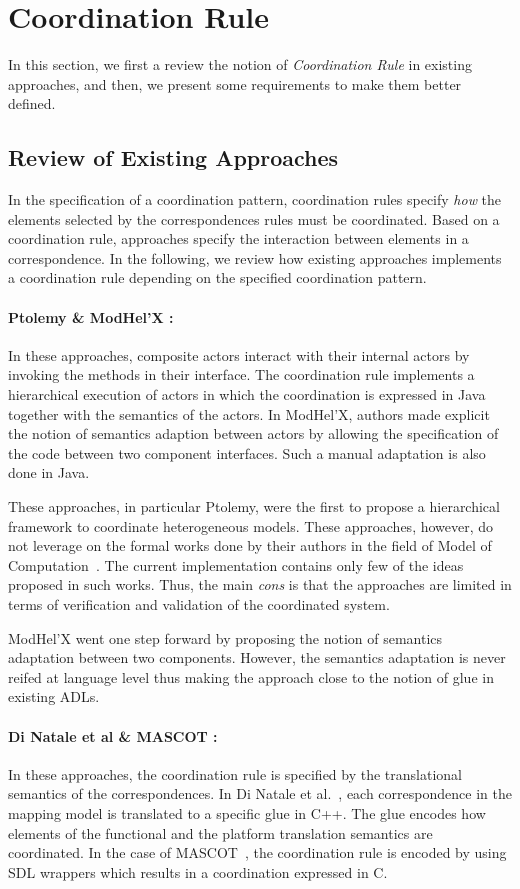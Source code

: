 \section{Coordination Rule}
In this section, we first a review the notion of \emph{Coordination Rule} in existing approaches, and then, we present some requirements to make them better defined. 

\subsection{Review of Existing Approaches}
In the specification of a coordination pattern, coordination rules specify \emph{how} the elements selected by the correspondences rules must be coordinated. Based on a coordination rule, approaches specify the interaction between elements in a correspondence. In the following, we review how existing approaches implements a coordination rule depending on the specified coordination pattern.  

\paragraph{Ptolemy \& ModHel'X :}	
In these approaches, composite actors interact with their internal actors by invoking the methods in their interface. The coordination rule implements a hierarchical execution of actors in which the coordination is expressed in Java together with the semantics of the actors. In ModHel'X, authors made explicit the notion of semantics adaption between actors by allowing the specification of the code between two component interfaces. Such a manual adaptation is also done in Java.

These approaches, in particular Ptolemy, were the first to propose a hierarchical framework to coordinate heterogeneous models. These approaches, however, do not leverage on the formal works done by their authors in the field of Model of Computation~\cite{lee1998framework}. The current implementation contains only few of the ideas proposed in such works. Thus, the main \emph{cons} is that the approaches are limited in terms of verification and validation of the coordinated system. 

ModHel'X went one step forward by proposing the notion of semantics adaptation between two components. However, the semantics adaptation is never reifed at language level thus making the approach close to the notion of glue in existing ADLs.

\paragraph{Di Natale et al \& MASCOT :}
In these approaches, the coordination rule is specified by the translational semantics of the correspondences. In Di Natale et al.~\cite{dinatale}, each correspondence in the mapping model is translated to a specific glue in C++. The glue encodes how elements of the functional and the platform translation semantics are coordinated. In the case of MASCOT~\cite{mascotbib}, the coordination rule is encoded by using SDL wrappers which results in a coordination expressed in C.

